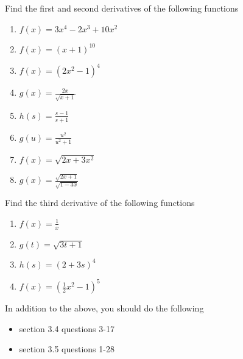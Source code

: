 \documentclass[12pt,letterpaper]{article}
\newenvironment{problem}[2][Problem]{\begin{trivlist}
\item[\hskip \labelsep {\bfseries #1}\hskip \labelsep {\bfseries #2.}]}{\end{trivlist}}
\newenvironment{sol}
    {\emph{Solution:}
    }
    {
    \qed
    }
\begin{document}



\begin{problem}{1}
Find the first and second derivatives of the following functions

  \begin{enumerate}[label=\roman*)]
  \item $ f(x) = \displaystyle3x^4-2x^3 + 10 x^2 $
  \item $ f(x) = \displaystyle(x+1)^{10}$
  \item $ f(x) = \displaystyle(2x^2-1)^4$
  \item $ g(x) = \displaystyle\frac{2x}{\sqrt{x+1}}$
  \item $h(s) = \displaystyle\frac{s-1}{s+1}$
  \item $g(u) = \displaystyle\frac{u^2}{u^2+1}$
  \item $f(x) = \displaystyle\sqrt{2x+3x^2}$
  \item $g(x) = \displaystyle\frac{\sqrt{2x+1}}{\sqrt{1-3x}}$
  \end{enumerate}

\end{problem}

\begin{problem}{2}
Find the third derivative of the following functions

  \begin{enumerate}[label=\roman*)]
  \item $\displaystyle f(x) = \frac{1}{x}$
  \item $ \displaystyle g(t) = \sqrt{3t+1}$
  \item $\displaystyle h(s) = (2+3s)^4$
    \item $\displaystyle f(x) = (\frac{1}{2}x^2-1)^5$
  \end{enumerate}

\end{problem}


\noindent In addition to the above, you should do the following
\begin{itemize}
\item section 3.4 questions 3-17
\item section 3.5 questions 1-28
  
\end{itemize}


\end{document}
